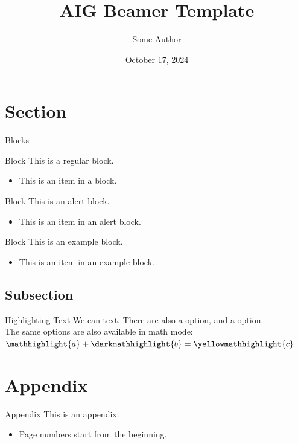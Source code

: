 \documentclass[aspectratio=169]{beamer} %
\title{AIG Beamer Template}
\author[S. Author]{Some Author}
\institute{Artificial Intelligence Group,\\
University of Hagen, Germany}
\date{October 17, 2024}
\begin{document}

\begin{frame}
  \titlepage
\end{frame}
\nologo

\section{Section}

\begin{frame}{Blocks}
    \begin{block}{Block}
        This is a regular block.
        \begin{itemize}
            \item This is an item in a block.
        \end{itemize}
    \end{block}
    
    \begin{alertblock}{Block}
        This is an alert block.
        \begin{itemize}
            \item This is an item in an alert block.
        \end{itemize}
    \end{alertblock}
    
    \begin{exampleblock}{Block}
        This is an example block.
        \begin{itemize}
            \item This is an item in an example block.
        \end{itemize}
    \end{exampleblock}
\end{frame}


\subsection{Subsection}

\begin{frame}{Highlighting Text}
    We can  text. There are also a  option, and a  option.\\
    The same options are also available in math mode: $\mathhighlight{a} + \darkmathhighlight{b} = \yellowmathhighlight{c}$
\end{frame}


\appendix

\section{Appendix}

\begin{frame}{Appendix}
    This is an appendix.
    \begin{itemize}
        \item Page numbers start from the beginning.
    \end{itemize}
\end{frame}
\end{document}
